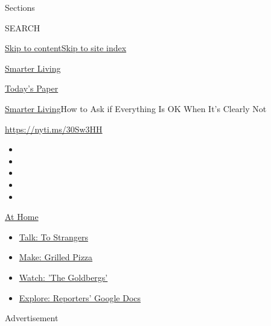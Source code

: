 Sections

SEARCH

\protect\hyperlink{site-content}{Skip to
content}\protect\hyperlink{site-index}{Skip to site index}

\href{https://www.nytimes.com/section/smarter-living}{Smarter Living}

\href{https://myaccount.nytimes.com/auth/login?response_type=cookie\&client_id=vi}{}

\href{https://www.nytimes.com/section/todayspaper}{Today's Paper}

\href{/section/smarter-living}{Smarter Living}\textbar{}How to Ask if
Everything Is OK When It's Clearly Not

\url{https://nyti.ms/30Sw3HH}

\begin{itemize}
\item
\item
\item
\item
\item
\end{itemize}

\href{https://www.nytimes.com/spotlight/at-home?action=click\&pgtype=Article\&state=default\&region=TOP_BANNER\&context=at_home_menu}{At
Home}

\begin{itemize}
\tightlist
\item
  \href{https://www.nytimes.com/2020/08/03/well/family/the-benefits-of-talking-to-strangers.html?action=click\&pgtype=Article\&state=default\&region=TOP_BANNER\&context=at_home_menu}{Talk:
  To Strangers}
\item
  \href{https://www.nytimes.com/2020/08/01/at-home/coronavirus-make-pizza-on-a-grill.html?action=click\&pgtype=Article\&state=default\&region=TOP_BANNER\&context=at_home_menu}{Make:
  Grilled Pizza}
\item
  \href{https://www.nytimes.com/2020/07/31/arts/television/goldbergs-abc-stream.html?action=click\&pgtype=Article\&state=default\&region=TOP_BANNER\&context=at_home_menu}{Watch:
  'The Goldbergs'}
\item
  \href{https://www.nytimes.com/interactive/2020/at-home/even-more-reporters-editors-diaries-lists-recommendations.html?action=click\&pgtype=Article\&state=default\&region=TOP_BANNER\&context=at_home_menu}{Explore:
  Reporters' Google Docs}
\end{itemize}

Advertisement

